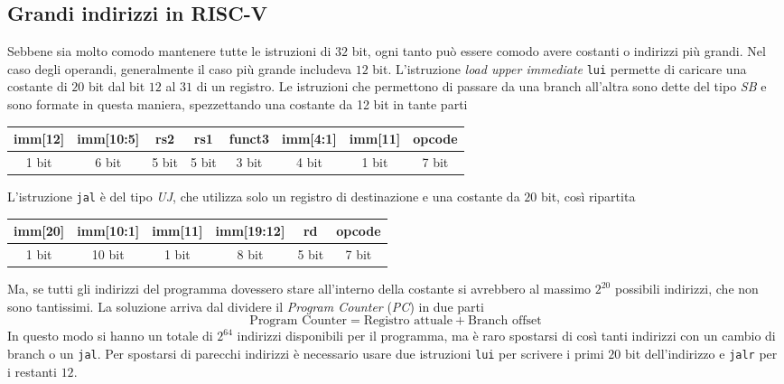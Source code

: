 \documentclass[a4paper,12pt]{article}
\theoremstyle{break}
\newcommand{\code}[1]{\texttt{#1}}
\numberwithin{equation}{section}
\begin{document}
\subsection{Grandi indirizzi in RISC-V}
Sebbene sia molto comodo mantenere tutte le istruzioni di \(32\) bit, ogni tanto può essere comodo avere costanti o indirizzi più grandi.  
Nel caso degli operandi, generalmente il caso più grande includeva \(12\) bit. L'istruzione \textit{load upper immediate} \code{lui} permette di caricare una costante di \(20\) bit dal bit \(12\) al \(31\) di un registro.  
Le istruzioni che permettono di passare da una branch all'altra sono dette del tipo \textit{SB} e sono formate in questa maniera, spezzettando una costante da 12 bit in tante parti
\begin{center}
    \begin{tabular}{|c|c|c|c|c|c|c|c|}
        \hline
        imm[12] & imm[10:5] & rs2 & rs1 & funct3 & imm[4:1] & imm[11] & opcode \\
        \hline
        \multicolumn{1}{c}{1 bit} & \multicolumn{1}{c}{6 bit} & \multicolumn{1}{c}{5 bit} & \multicolumn{1}{c}{5 bit} &\multicolumn{1}{c}{3 bit} &\multicolumn{1}{c}{4 bit} &
        \multicolumn{1}{c}{1 bit} &
        \multicolumn{1}{c}{7 bit}
    \end{tabular}
\end{center}
L'istruzione \code{jal} è del tipo \textit{UJ}, che utilizza solo un registro di destinazione e una costante da \(20\) bit, così ripartita
\begin{center}
    \begin{tabular}{|c|c|c|c|c|c|}
        \hline 
        imm[20] & imm[10:1] & imm[11] & imm[19:12] & rd & opcode \\
        \hline
        \multicolumn{1}{c}{1 bit} & \multicolumn{1}{c}{10 bit} & \multicolumn{1}{c}{1 bit} & \multicolumn{1}{c}{8 bit} & \multicolumn{1}{c}{5 bit} & 
        \multicolumn{1}{c}{7 bit} 
    \end{tabular}
\end{center}
Ma, se tutti gli indirizzi del programma dovessero stare all'interno della costante si avrebbero al massimo \(2^{20}\) possibili indirizzi, che non sono tantissimi. La soluzione arriva dal dividere il \textit{Program Counter} (\textit{PC}) in due parti
\[
    \mbox{Program Counter} = \mbox{Registro attuale} + \mbox{Branch offset}
\]
In questo modo si hanno un totale di \(2^{64}\) indirizzi disponibili per il programma, ma è raro spostarsi di così tanti indirizzi con un cambio di branch o un \code{jal}. Per spostarsi di parecchi indirizzi è necessario usare due istruzioni \code{lui} per scrivere i primi \(20\) bit dell'indirizzo e \code{jalr} per i restanti \(12\).  
\end{document}
